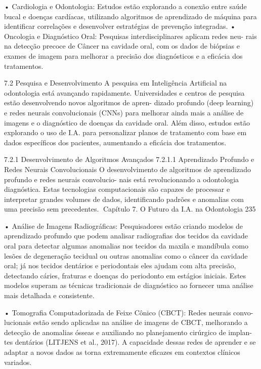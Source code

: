     • Cardiologia e Odontologia: Estudos estão explorando a conexão entre saúde
      bucal e doenças cardíacas, utilizando algoritmos de aprendizado de máquina
      para identificar correlações e desenvolver estratégias de prevenção integradas.
    • Oncologia e Diagnóstico Oral: Pesquisas interdisciplinares aplicam redes neu-
      rais na detecção precoce de Câncer na cavidade oral, com os dados de biópsias
      e exames de imagem para melhorar a precisão dos diagnósticos e a eficácia dos
      tratamentos.


7.2       Pesquisa e Desenvolvimento
A pesquisa em Inteligência Artificial na odontologia está avançando rapidamente.
Universidades e centros de pesquisa estão desenvolvendo novos algoritmos de apren-
dizado profundo (deep learning) e redes neurais convolucionais (CNNs) para melhorar
ainda mais a análise de imagens e o diagnóstico de doenças da cavidade oral. Além
disso, estudos estão explorando o uso de I.A. para personalizar planos de tratamento
com base em dados específicos dos pacientes, aumentando a eficácia dos tratamentos.

7.2.1     Desenvolvimento de Algoritmos Avançados
7.2.1.1   Aprendizado Profundo e Redes Neurais Convolucionais
O desenvolvimento de algoritmos de aprendizado profundo e redes neurais convolucio-
nais está revolucionando a odontologia diagnóstica. Estas tecnologias computacionais
são capazes de processar e interpretar grandes volumes de dados, identificando
padrões e anomalias com uma precisão sem precedentes.
Capítulo 7. O Futuro da I.A. na Odontologia                                       235


    • Análise de Imagens Radiográficas: Pesquisadores estão criando modelos de
      aprendizado profundo que podem analisar radiografias dos tecidos da cavidade
      oral para detectar algumas anomalias nos tecidos da maxila e mandíbula como
      lesões de degeneração tecidual ou outras anomalias como o câncer da cavidade
      oral; já nos tecidos dentários e periodontais eles ajudam com alta precisão,
      detectando cáries, fraturas e doenças do periodonto em estágios iniciais. Estes
      modelos superam as técnicas tradicionais de diagnóstico ao fornecer uma análise
      mais detalhada e consistente.

    • Tomografia Computadorizada de Feixe Cônico (CBCT): Redes neurais convo-
      lucionais estão sendo aplicadas na análise de imagens de CBCT, melhorando a
      detecção de anomalias ósseas e auxiliando no planejamento cirúrgico de implan-
      tes dentários (LITJENS et al., 2017). A capacidade dessas redes de aprender e
      se adaptar a novos dados as torna extremamente eficazes em contextos clínicos
      variados.

